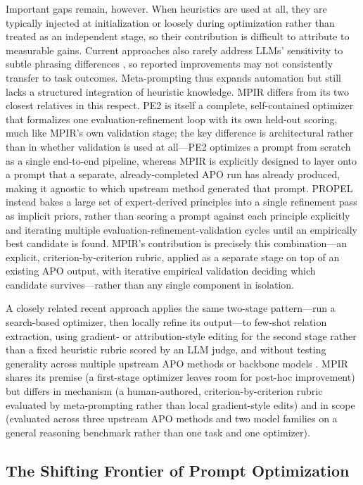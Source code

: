 \documentclass[a4paper,fleqn]{cas-sc}
\begin{document}
Important gaps remain, however. When heuristics are used at all, they are typically injected at initialization \citep{yang2024b} or loosely during optimization \citep{mayilvaghanan2025} rather than treated as an independent stage, so their contribution is difficult to attribute to measurable gains. Current approaches also rarely address LLMs' sensitivity to subtle phrasing differences \citep{errica2025}, so reported improvements may not consistently transfer to task outcomes. Meta-prompting thus expands automation but still lacks a structured integration of heuristic knowledge. MPIR differs from its two closest relatives in this respect. PE2 is itself a complete, self-contained optimizer that formalizes one evaluation-refinement loop with its own held-out scoring, much like MPIR's own validation stage; the key difference is architectural rather than in whether validation is used at all---PE2 optimizes a prompt from scratch as a single end-to-end pipeline, whereas MPIR is explicitly designed to layer onto a prompt that a separate, already-completed APO run has already produced, making it agnostic to which upstream method generated that prompt. PROPEL instead bakes a large set of expert-derived principles into a single refinement pass as implicit priors, rather than scoring a prompt against each principle explicitly and iterating multiple evaluation-refinement-validation cycles until an empirically best candidate is found. MPIR's contribution is precisely this combination---an explicit, criterion-by-criterion rubric, applied as a separate stage on top of an existing APO output, with iterative empirical validation deciding which candidate survives---rather than any single component in isolation.

A closely related recent approach applies the same two-stage pattern---run a search-based optimizer, then locally refine its output---to few-shot relation extraction, using gradient- or attribution-style editing for the second stage rather than a fixed heuristic rubric scored by an LLM judge, and without testing generality across multiple upstream APO methods or backbone models \citep{chakma2026}. MPIR shares its premise (a first-stage optimizer leaves room for post-hoc improvement) but differs in mechanism (a human-authored, criterion-by-criterion rubric evaluated by meta-prompting rather than local gradient-style edits) and in scope (evaluated across three upstream APO methods and two model families on a general reasoning benchmark rather than one task and one optimizer).

\subsection{The Shifting Frontier of Prompt Optimization}
\end{document}
